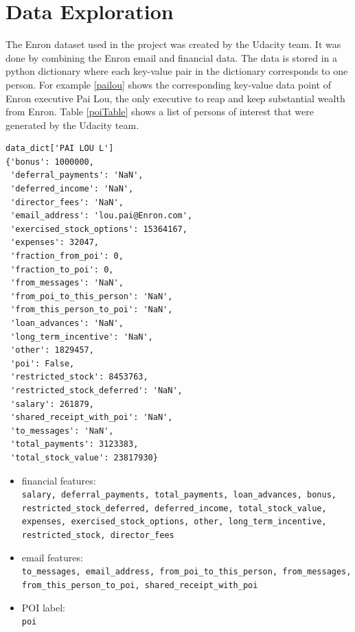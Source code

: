 \documentclass[twoside,openright,titlepage,numbers=noenddot,headinclude,%
               footinclude=true,cleardoublepage=empty,abstractoff,BCOR=5mm,%
               paper=a4,fontsize=11pt,ngerman,american]{scrreprt}
\numberwithin{theorem}{chapter}
\numberwithin{definition}{chapter}
\numberwithin{algorithm}{chapter}
\numberwithin{figure}{chapter}
\numberwithin{table}{chapter}
\numberwithin{equation}{chapter}
\begin{document}
\section*{Data Exploration}

The Enron dataset used in the project was created by the Udacity team. It was done by combining the Enron email and financial data. The data is stored in a python dictionary where each key-value pair in the dictionary corresponds to one person. For example \ref{pailou} shows the corresponding key-value data point of Enron executive Pai Lou, the only executive to reap and keep substantial wealth from Enron. Table \ref{poiTable} shows a list of persons of interest that were generated by the Udacity team.
\label{pailou}
\begin{verbatim}
data_dict['PAI LOU L']
{'bonus': 1000000,
 'deferral_payments': 'NaN',
 'deferred_income': 'NaN',
 'director_fees': 'NaN',
 'email_address': 'lou.pai@Enron.com',
 'exercised_stock_options': 15364167,
 'expenses': 32047,
 'fraction_from_poi': 0,
 'fraction_to_poi': 0,
 'from_messages': 'NaN',
 'from_poi_to_this_person': 'NaN',
 'from_this_person_to_poi': 'NaN',
 'loan_advances': 'NaN',
 'long_term_incentive': 'NaN',
 'other': 1829457,
 'poi': False,
 'restricted_stock': 8453763,
 'restricted_stock_deferred': 'NaN',
 'salary': 261879,
 'shared_receipt_with_poi': 'NaN',
 'to_messages': 'NaN',
 'total_payments': 3123383,
 'total_stock_value': 23817930}
\end{verbatim}


\begin{itemize}%
\item financial features:\\ \texttt{salary, deferral\_payments, total\_payments, loan\_advances, bonus, restricted\_stock\_deferred, deferred\_income, total\_stock\_value, expenses, exercised\_stock\_options, other, long\_term\_incentive, restricted\_stock, director\_fees}

\item email features:\\ \texttt{to\_messages, email\_address, from\_poi\_to\_this\_person, from\_messages, from\_this\_person\_to\_poi, shared\_receipt\_with\_poi}

\item POI label:\\ \texttt{poi}
\end{itemize}
\end{document}
